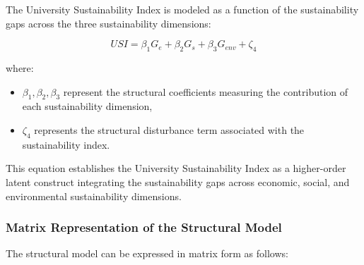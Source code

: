 \documentclass[11pt,a4paper]{article}
\begin{document}
The University Sustainability Index is modeled as a function of the sustainability gaps across the three sustainability dimensions:

\begin{equation}
USI = \beta_1 G_e + \beta_2 G_s + \beta_3 G_{env} + \zeta_4
\end{equation}

where:

\begin{itemize}
\item $\beta_1, \beta_2, \beta_3$ represent the structural coefficients measuring the contribution of each sustainability dimension,
\item $\zeta_4$ represents the structural disturbance term associated with the sustainability index.
\end{itemize}

This equation establishes the University Sustainability Index as a higher-order latent construct integrating the sustainability gaps across economic, social, and environmental sustainability dimensions.

\subsubsection{Matrix Representation of the Structural Model}

The structural model can be expressed in matrix form as follows:
\end{document}
